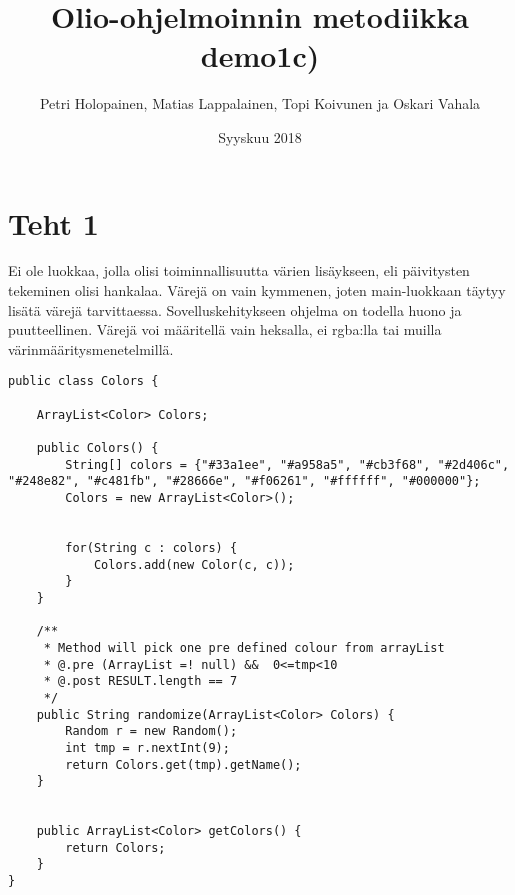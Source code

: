 \documentclass[a4paper,12pt,titlepage]{article}
\title{Olio-ohjelmoinnin metodiikka demo1}
\author{Petri Holopainen, Matias Lappalainen, Topi Koivunen ja Oskari Vahala\\[1cm]
}
\date{Syyskuu 2018}
\theoremstyle{definition}
\theoremstyle{remark}
\begin{document}
\maketitle          %


\section{Teht 1}
\title{c)}
\newline
Ei ole luokkaa, jolla olisi toiminnallisuutta värien lisäykseen, eli päivitysten tekeminen olisi hankalaa. Värejä on vain kymmenen, joten main-luokkaan täytyy lisätä värejä tarvittaessa. Sovelluskehitykseen ohjelma on todella huono ja puutteellinen. Värejä voi määritellä vain heksalla, ei rgba:lla tai muilla värinmääritysmenetelmillä.


\renewcommand{\refname}{Kirjallisuutta} %

\newpage

\begin{lstlisting}
public class Colors {

    ArrayList<Color> Colors;

    public Colors() {
        String[] colors = {"#33a1ee", "#a958a5", "#cb3f68", "#2d406c", "#248e82", "#c481fb", "#28666e", "#f06261", "#ffffff", "#000000"};
        Colors = new ArrayList<Color>();


        for(String c : colors) {
            Colors.add(new Color(c, c));
        }
    }

    /**
     * Method will pick one pre defined colour from arrayList
     * @.pre (ArrayList =! null) &&  0<=tmp<10
     * @.post RESULT.length == 7
     */
    public String randomize(ArrayList<Color> Colors) {
        Random r = new Random();
        int tmp = r.nextInt(9);
        return Colors.get(tmp).getName();
    }


    public ArrayList<Color> getColors() {
        return Colors;
    }
}
\end{lstlisting}

\newpage
\end{document}

